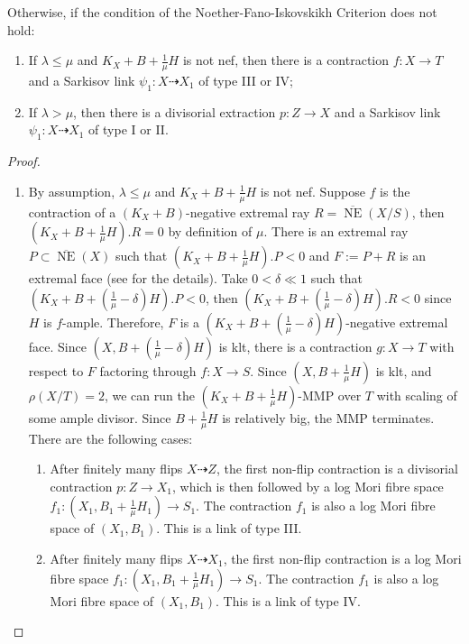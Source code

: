 Otherwise, if the condition of the Noether-Fano-Iskovskikh Criterion does not hold:
\begin{claim}
  \begin{enumerate}
    \item If $ \lambda\leqslant\mu $ and $ K_X+B+\frac{1}{\mu}H $ is not nef, then there is a contraction $f:X \to T$ and a Sarkisov link $\psi_{1}:X\dashrightarrow X_{1}$ of type III or IV;
    \item  If $ \lambda>\mu $, then there is a divisorial extraction $p:Z\to X$ and a Sarkisov link $ \psi_{1}:X\dashrightarrow X_{1}$ of type I or II.
  \end{enumerate}
\end{claim}
\begin{proof}
  \begin{enumerate}
    \item\label{a} By assumption,  $\lambda\leqslant \mu$ and   $ K_X+B+\frac{1}{\mu}H $ is not nef. Suppose $ f $ is the contraction of a $ (K_X+B) $-negative extremal ray $ R= \overline{\operatorname{ NE }}(X/S) $, then $ (K_X+B+\frac{1}{\mu}H).R=0 $ by definition of $ \mu $. There is an extremal ray $ P \subset \overline{\operatorname{ NE }}(X) $ such that $ (K_X+B+\frac{1}{\mu}H).P<0 $ and $ F:=P+R $ is an extremal face  (see \cite[5.4.2]{cortiFactoringBirationalMaps} for the details). Take  $ 0<\delta\ll 1 $ such that $ (K_X+B+(\frac{1}{\mu}-\delta)H).P<0 $, then $  (K_X+B+(\frac{1}{\mu}-\delta)H).R<0 $ since $H$ is $f$-ample. Therefore, $ F $ is a $  (K_X+B+(\frac{1}{\mu}-\delta)H) $-negative extremal face. Since $ (X,B+(\frac{1}{\mu}-\delta)H) $ is klt, there is  a contraction $ g:X\to T $ with respect to $F$ factoring through $ f:X\to S $. Since  $ (X,B+\frac{1}{\mu}H) $ is klt, and $ \rho(X/T)=2 $,  we can  run the  $ (K_X+B+\frac{1}{\mu}H) $-MMP over $T$ with scaling of some ample divisor.  Since $ B+\frac{1}{\mu}H $ is relatively big,  the MMP terminates. There are the following cases:
    \begin{enumerate}
      \item\label{a1}
      After finitely many flips $ X\dashrightarrow Z $, the first non-flip contraction is a divisorial contraction $ p:Z\to X_1 $, which is then followed by a log Mori fibre space $f_{1}:(X_{1},B_{1}+\frac{1}{\mu}H_{1})\to S_1$. The contraction $f_1$ is also a log Mori fibre space of $(X_{1},B_{1})$.
      This is a link of type III.
      \item\label{a2}
      After finitely many flips $ X\dashrightarrow X_1 $, the first non-flip contraction is a log Mori fibre space $ f_1:(X_1,B_1+\frac{1}{\mu}H_1)\to S_{1} $. The contraction $f_1$ is also a log Mori fibre space of $(X_{1},B_{1})$. This is a link of type IV.

\end{enumerate}
\end{enumerate}
\end{proof}
